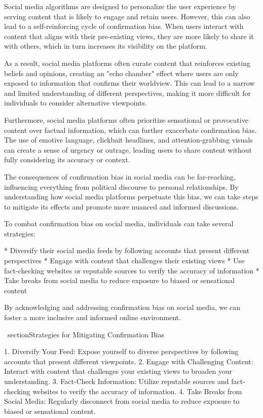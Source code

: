 \documentclass{report}%
\begin{document}
{{{{{{{{{{{{{{Social media algorithms are designed to personalize the user experience by serving content that is likely to engage and retain users. However, this can also lead to a self-reinforcing cycle of confirmation bias. When users interact with content that aligns with their pre-existing views, they are more likely to share it with others, which in turn increases its visibility on the platform.

As a result, social media platforms often curate content that reinforces existing beliefs and opinions, creating an "echo chamber" effect where users are only exposed to information that confirms their worldview. This can lead to a narrow and limited understanding of different perspectives, making it more difficult for individuals to consider alternative viewpoints.

Furthermore, social media platforms often prioritize sensational or provocative content over factual information, which can further exacerbate confirmation bias. The use of emotive language, clickbait headlines, and attention-grabbing visuals can create a sense of urgency or outrage, leading users to share content without fully considering its accuracy or context.

The consequences of confirmation bias in social media can be far-reaching, influencing everything from political discourse to personal relationships. By understanding how social media platforms perpetuate this bias, we can take steps to mitigate its effects and promote more nuanced and informed discussions.

To combat confirmation bias on social media, individuals can take several strategies:

*   Diversify their social media feeds by following accounts that present different perspectives
*   Engage with content that challenges their existing views
*   Use fact-checking websites or reputable sources to verify the accuracy of information
*   Take breaks from social media to reduce exposure to biased or sensational content

By acknowledging and addressing confirmation bias on social media, we can foster a more inclusive and informed online environment.

\ section{Strategies for Mitigating Confirmation Bias}

1.  Diversify Your Feed: Expose yourself to diverse perspectives by following accounts that present different viewpoints.
2.  Engage with Challenging Content: Interact with content that challenges your existing views to broaden your understanding.
3.  Fact-Check Information: Utilize reputable sources and fact-checking websites to verify the accuracy of information.
4.  Take Breaks from Social Media: Regularly disconnect from social media to reduce exposure to biased or sensational content.

}}}}}}}}}}}}}}
\end{document}

